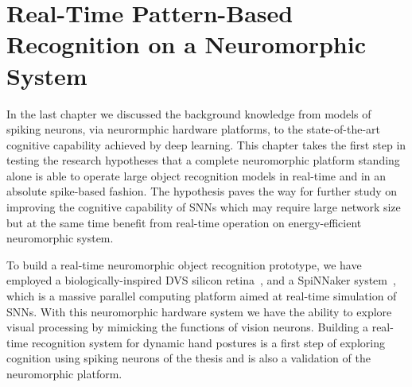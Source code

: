 \chapter{Real-Time Pattern-Based Recognition on a Neuromorphic System}
\label{cha:pattern}

In the last chapter we discussed the background knowledge from models of spiking neurons, via neurormphic hardware platforms, to the state-of-the-art cognitive capability achieved by deep learning.
This chapter takes the first step in testing the research hypotheses that a complete neuromorphic platform standing alone is able to operate large object recognition models in real-time and in an absolute spike-based fashion.
The hypothesis paves the way for further study on improving the cognitive capability of SNNs which may require large network size but at the same time benefit from real-time operation on energy-efficient neuromorphic system.



To build a real-time neuromorphic object recognition prototype, we have employed a biologically-inspired DVS silicon retina~\cite{lenero20113}, and a SpiNNaker system~\cite{furber2014spinnaker}, which is a massive parallel computing platform aimed at real-time simulation of SNNs. 
With this neuromorphic hardware system we have the ability to explore visual processing by mimicking the functions of vision neurons. 
Building a real-time recognition system for dynamic hand postures is a first step of exploring cognition using spiking neurons of the thesis and is also a validation of the neuromorphic platform.


